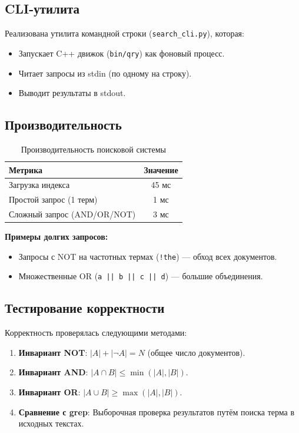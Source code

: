 \documentclass[a4paper,12pt]{article}
\begin{document}
\subsection{CLI-утилита}
Реализована утилита командной строки (\texttt{search\_cli.py}), которая:
\begin{itemize}
    \item Запускает C++ движок (\texttt{bin/qry}) как фоновый процесс.
    \item Читает запросы из stdin (по одному на строку).
    \item Выводит результаты в stdout.
\end{itemize}

\subsection{Производительность}
\begin{table}[H]
\centering
\begin{tabular}{|l|c|}
\hline
\textbf{Метрика} & \textbf{Значение} \\
\hline
Загрузка индекса & 45 мс \\
\hline
Простой запрос (1 терм) & 1 мс \\
\hline
Сложный запрос (AND/OR/NOT) & 3 мс \\
\hline
\end{tabular}
\caption{Производительность поисковой системы}
\end{table}

\textbf{Примеры долгих запросов:}
\begin{itemize}
    \item Запросы с NOT на частотных термах (\texttt{!the}) — обход всех документов.
    \item Множественные OR (\texttt{a || b || c || d}) — большие объединения.
\end{itemize}

\subsection{Тестирование корректности}
Корректность проверялась следующими методами:
\begin{enumerate}
    \item \textbf{Инвариант NOT}: $|A| + |\neg A| = N$ (общее число документов).
    \item \textbf{Инвариант AND}: $|A \cap B| \leq \min(|A|, |B|)$.
    \item \textbf{Инвариант OR}: $|A \cup B| \geq \max(|A|, |B|)$.
    \item \textbf{Сравнение с grep}: Выборочная проверка результатов путём поиска терма в исходных текстах.
\end{enumerate}
\end{document}
